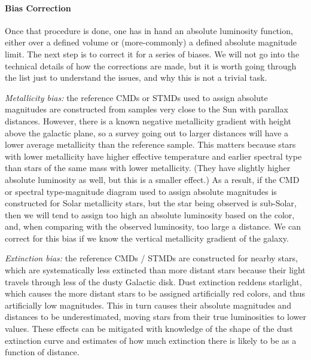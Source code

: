 \paragraph{Bias Correction}

Once that procedure is done, one has in hand an absolute luminosity function, either over a defined volume or (more-commonly) a defined absolute magnitude limit. The next step is to correct it for a series of biases. We will not go into the technical details of how the corrections are made, but it is worth going through the list just to understand the issues, and why this is not a trivial task.

\textit{Metallicity bias:} the reference CMDs or STMDs used to assign absolute magnitudes are constructed from samples very close to the Sun with parallax distances. However, there is a known negative metallicity gradient with height above the galactic plane, so a survey going out to larger distances will have a lower average metallicity than the reference sample. This matters because stars with lower metallicity have higher effective temperature and earlier spectral type than stars of the same mass with lower metallicity. (They have slightly higher absolute luminosity as well, but this is a smaller effect.) As a result, if the CMD or spectral type-magnitude diagram used to assign absolute magnitudes is constructed for Solar metallicity stars, but the star being observed is sub-Solar, then we will tend to assign too high an absolute luminosity based on the color, and, when comparing with the observed luminosity, too large a distance. We can correct for this bias if we know the vertical metallicity gradient of the galaxy.

\textit{Extinction bias:} the reference CMDs / STMDs are constructed for nearby stars, which are systematically less extincted than more distant stars because their light travels through less of the dusty Galactic disk. Dust extinction reddens starlight, which causes the more distant stars to be assigned artificially red colors, and thus artificially low magnitudes. This in turn causes their absolute magnitudes and distances to be underestimated, moving stars from their true luminosities to lower values. These effects can be mitigated with knowledge of the shape of the dust extinction curve and estimates of how much extinction there is likely to be as a function of distance.

